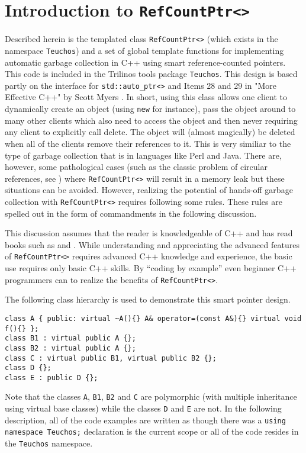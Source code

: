 %
\section{Introduction to {}\texttt{RefCountPtr<>}}
\label{rcp:sec:intro}
%

Described herein is the templated class {}\texttt{RefCountPtr<>}
(which exists in the namespace {}\texttt{Teuchos}) and a set of global
template functions for implementing automatic garbage collection in
C++ using smart reference-counted pointers.  This code is included in
the Trilinos {}\cite{ref:Trilinos-Overview} tools package
{}\texttt{Teuchos}.  This design is based partly on the interface for
{}\texttt{std::auto\_ptr<>} and Items 28 and 29 in "More Effective
C++" by Scott Myers {}\cite{ref:meyers_1996}.  In short, using this
class allows one client to dynamically create an object (using
{}\texttt{new} for instance), pass the object around to many other
clients which also need to access the object and then never requiring
any client to explicitly call delete.  The object will (almost
magically) be deleted when all of the clients remove their references
to it.  This is very similiar to the type of garbage collection that
is in languages like Perl and Java.  There are, however, some
pathological cases (such as the classic problem of circular
references, see {}\cite[Item 29, page 212]{ref:meyers_1996}) where
{}\texttt{RefCountPtr<>} will result in a memory leak but these
situations can be avoided.  However, realizing the potential of
hands-off garbage collection with {}\texttt{RefCountPtr<>} requires
following some rules.  These rules are spelled out in the form of
commandments in the following discussion.

This discussion assumes that the reader is knowledgeable of C++ and
has read books such as {}\cite{ref:stroustrup_2000} and
{}\cite{ref:meyers_1994}.  While understanding and appreciating the
advanced features of {}\texttt{RefCountPtr<>} requires advanced C++
knowledge and experience, the basic use requires only basic C++
skills.  By ``coding by example'' even beginner C++ programmers can to
realize the benefits of {}\texttt{RefCountPtr<>}.

The following class hierarchy is used to demonstrate this smart
pointer design.
%
{\scriptsize\begin{verbatim}
class A { public: virtual ~A(){} A& operator=(const A&){} virtual void f(){} };
class B1 : virtual public A {};
class B2 : virtual public A {};
class C : virtual public B1, virtual public B2 {};
class D {};
class E : public D {};
\end{verbatim}}
%
Note that the classes {}\texttt{A}, {}\texttt{B1}, {}\texttt{B2} and
{}\texttt{C} are polymorphic (with multiple inheritance using virtual
base classes) while the classes {}\texttt{D} and {}\texttt{E} are not.
In the following description, all of the code examples are written as
though there was a {}\texttt{using namespace Teuchos;} declaration is
the current scope or all of the code resides in the {}\texttt{Teuchos}
namespace.

